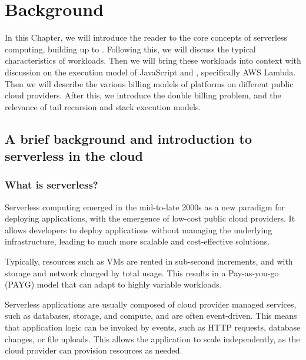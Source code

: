\chapter{Background}
\label{chap:background}

In this Chapter, we will introduce the reader to the core concepts of serverless computing, building up to \faas{}. Following this, we will discuss the typical characteristics of \faas{} workloads. Then we will bring these workloads into context with discussion on the execution model of JavaScript and \faas{}, specifically AWS Lambda. Then we will describe the various billing models of \faas{} platforms on different public cloud providers. After this, we introduce the double billing problem, and the relevance of tail recursion and stack execution models.


\section{A brief background and introduction to serverless in the cloud}
\subsection{What is serverless?}
Serverless computing emerged in the mid-to-late 2000s\cite{wardleyWardleyMaps2022,IntroducingGoogleApp,patilServerlessComputingEmergence2021} as a new paradigm for deploying applications, with the emergence of low-cost public cloud providers\cite{patilServerlessComputingEmergence2021,BenjaminBlackEC2}. It allows developers to deploy applications without managing the underlying infrastructure, leading to much more scalable and cost-effective solutions.

Typically, resources such as VMs\cite{hoeferTaxonomyCloudComputing2010} are rented in sub-second increments, and with storage and network charged by total usage. This results in a Pay-as-you-go (PAYG) model that can adapt to highly variable workloads\cite{sehgalCostBillingPractices2023,hilleyCloudComputingTaxonomy2009}.

Serverless applications are usually composed of cloud provider managed services, such as databases, storage, and compute, and are often event-driven\cite{EventarcOverview,EventListenerAmazon,robeceOverviewAzureEvent2024}. This means that application logic can be invoked by events, such as HTTP requests, database changes, or file uploads. This allows the application to scale independently\cite{goniwadaCloudNativeArchitecture2022}, as the cloud provider can provision resources as needed.

